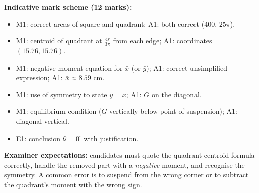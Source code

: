 \documentclass[11pt]{article}
\begin{document}
\begin{corrige}
\textbf{Indicative mark scheme (12 marks):}
\begin{itemize}
\item M1: correct areas of square and quadrant; A1: both correct ($400$, $25\pi$).
\item M1: centroid of quadrant at $\frac{4r}{3\pi}$ from each edge; A1: coordinates $(15.76, 15.76)$.
\item M1: negative-moment equation for $\bar{x}$ (or $\bar{y}$); A1: correct unsimplified expression; A1: $\bar{x} \approx 8.59$ cm.
\item M1: use of symmetry to state $\bar{y} = \bar{x}$; A1: $G$ on the diagonal.
\item M1: equilibrium condition ($G$ vertically below point of suspension); A1: diagonal vertical.
\item E1: conclusion $\theta = 0^\circ$ with justification.
\end{itemize}
\textbf{Examiner expectations:} candidates must quote the quadrant centroid formula correctly, handle the removed part with a \emph{negative} moment, and recognise the symmetry. A common error is to suspend from the wrong corner or to subtract the quadrant's moment with the wrong sign.
\end{corrige}
\end{document}
